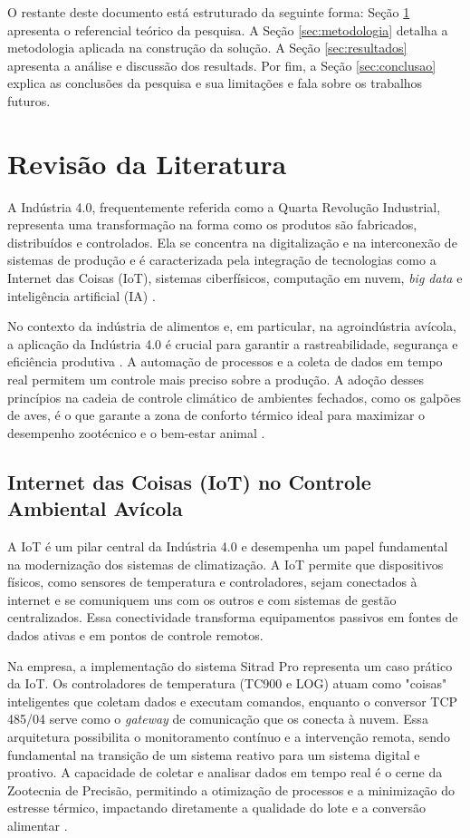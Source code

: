 \documentclass[12pt]{article}
\begin{document}
O restante deste documento está estruturado da seguinte forma: Seção \ref{sec:referencial_teorico} apresenta o referencial teórico da pesquisa. A Seção \ref{sec:metodologia} detalha a metodologia aplicada na construção da solução. A Seção \ref{sec:resultados} apresenta a análise e discussão dos resultads. Por fim, a Seção \ref{sec:conclusao} explica as conclusões da pesquisa e sua limitações e fala sobre os trabalhos futuros.

\section{Revisão da Literatura} \label{sec:referencial_teorico}

A Indústria 4.0, frequentemente referida como a Quarta Revolução Industrial, representa uma transformação na forma como os produtos são fabricados, distribuídos e controlados. Ela se concentra na digitalização e na interconexão de sistemas de produção e é caracterizada pela integração de tecnologias como a Internet das Coisas (IoT), sistemas ciberfísicos, computação em nuvem, \textit{big data} e inteligência artificial (IA) \cite{RIFFAI_2022}.

No contexto da indústria de alimentos e, em particular, na agroindústria avícola, a aplicação da Indústria 4.0 é crucial para garantir a rastreabilidade, segurança e eficiência produtiva \cite{JARDIM_2023}. A automação de processos e a coleta de dados em tempo real permitem um controle mais preciso sobre a produção. A adoção desses princípios na cadeia de controle climático de ambientes fechados, como os galpões de aves, é o que garante a zona de conforto térmico ideal para maximizar o desempenho zootécnico e o bem-estar animal \cite{TINOCO_2011}.

\subsection{Internet das Coisas (IoT) no Controle Ambiental Avícola}

A IoT é um pilar central da Indústria 4.0 e desempenha um papel fundamental na modernização dos sistemas de climatização. A IoT permite que dispositivos físicos, como sensores de temperatura e controladores, sejam conectados à internet e se comuniquem uns com os outros e com sistemas de gestão centralizados. Essa conectividade transforma equipamentos passivos em fontes de dados ativas e em pontos de controle remotos.

Na empresa, a implementação do sistema Sitrad Pro representa um caso prático da IoT. Os controladores de temperatura (TC900 e LOG) atuam como "coisas" inteligentes que coletam dados e executam comandos, enquanto o conversor TCP 485/04 serve como o \textit{gateway} de comunicação que os conecta à nuvem. Essa arquitetura possibilita o monitoramento contínuo e a intervenção remota, sendo fundamental na transição de um sistema reativo para um sistema digital e proativo. A capacidade de coletar e analisar dados em tempo real é o cerne da Zootecnia de Precisão, permitindo a otimização de processos e a minimização do estresse térmico, impactando diretamente a qualidade do lote e a conversão alimentar \cite{ABREU_2016}.
\end{document}
